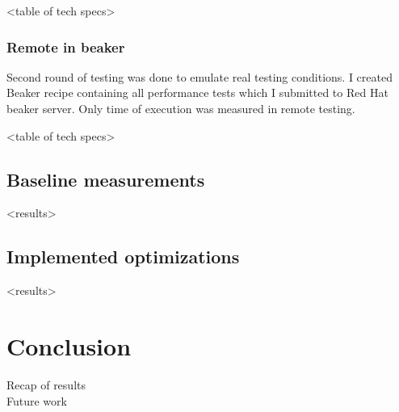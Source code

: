 <table of tech specs>

\subsection{Remote in beaker}
Second round of testing was done to emulate real testing conditions. I created Beaker recipe containing all performance tests which I submitted to Red Hat beaker server. Only time of execution was measured in remote testing.

<table of tech specs>

\section{Baseline measurements}
<results>


\section{Implemented optimizations}
<results>

\chapter{Conclusion}
Recap of results
\\
Future work


